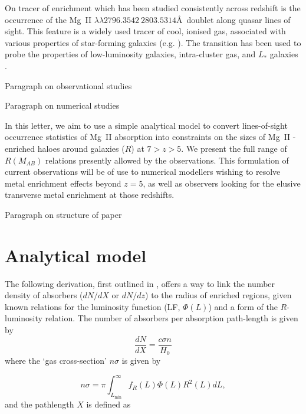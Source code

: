 \documentclass[useAMS,usenatbib]{mn2e}
\newcommand{\magtwo}{Mg~{\small II} }
\begin{document}
On tracer of enrichment which has been studied consistently across redshift is the occurrence of the \magtwo $\lambda \lambda 2796.3542 \ 2803.5314$\AA \ doublet along quasar lines of sight. This feature is a widely used tracer of cool, ionised gas, associated with various properties of star-forming galaxies (e.g. \citealt{Churchill99, Churchill13, Menard09, Weiner09, Chen10, Kacprzak11, Matejek12}). The transition has been used to probe the properties of low-luminosity galaxies, intra-cluster gas, and $L_*$ galaxies \citep{Churchill99, Gauthier13, Bergeron91, Steidel94}.

Paragraph on observational studies

Paragraph on numerical studies

In this letter, we aim to use a simple analytical model to convert lines-of-sight occurrence statistics of \magtwo absorption into constraints on the sizes of \magtwo-enriched haloes around galaxies ($R$) at $7>z>5$. We present the full range of $R(M_{AB})$ relations presently allowed by the observations. This formulation of current observations will be of use to numerical modellers wishing to resolve metal enrichment effects beyond $z=5$, as well as observers looking for the elusive transverse metal enrichment at those redshifts.


Paragraph on structure of paper


\section{Analytical model}

The following derivation, first outlined in \citet{Steidel95}, offers a way to link the number density of absorbers ($dN/dX$ or $dN/dz$) to the radius of enriched regions, given known relations for the luminosity function (LF, $\Phi(L)$) and a form of the $R$-luminosity relation.
The number of absorbers per absorption path-length is given by
\begin{equation}
\frac{dN}{dX} =  \frac{c \sigma n}{H_0} 
\end{equation}
where the `gas cross-section' $n\sigma$ is given by

\begin{equation}
n \sigma = \pi \int_{L_\text{min}}^\infty f_R(L) \Phi(L) R^2(L) dL,
\end{equation}
and the pathlength $X$ is defined as 
\end{document}
